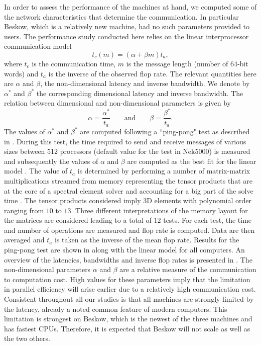 \documentclass{sig-alternate}
\begin{document}
In order to assess the performance of the machines at hand, we computed  some of the network characteristics that determine the communication. In particular Beskow, which is a relatively new machine, had no such parameters provided to users. 
The performance study conducted here relies on the linear interprocessor communication  model
\begin{equation}
 t_c(m) = (\alpha + \beta m) t_a,\label{eqn:lincomm}
\end{equation}
where $t_c$ is the communication time, $m$ is the message length (number of
64-bit words) and $t_a$ is the inverse of the observed flop rate. The relevant
quantities here are $\alpha$ and $\beta$, the non-dimensional latency and inverse
 bandwidth. We denote by $\alpha^*$ and $\beta^*$ the corresponding dimensional 
latency and inverse bandwidth. The relation between dimensional and non-dimensional parameters is given by
\begin{equation*}
\alpha = \frac{\alpha^*}{t_a} \qquad \text{and} \qquad \beta = \frac{\beta^*}{t_a}.
\end{equation*}
The values of $\alpha^*$ and $\beta^*$ are computed following a ``ping-pong" test 
as described in \cite{fischer:scaling}. During this test, the time required to 
send and receive messages of various sizes between 512 processors (default value
for the test in Nek5000) is measured 
and subsequently the values of $\alpha$ and $\beta$ are computed as the best fit 
for the linear model . The value of $t_a$ is determined by 
performing a number of matrix-matrix multiplications streamed from memory
representing the tensor products that are at the core of a spectral element 
solver \cite{fischer:hom} and accounting for a big part of the solve time 
\cite{Max2016}. The tensor products considered imply 3D elements with polynomial 
order ranging from $10$ to $13$. Three different interpretations of the memory 
layout for the matrices are considered 
leading to a total of $12$ tests. For each test, the time and number of operations are
measured and flop rate is computed. Data are then averaged and $t_a$ is taken as the
inverse of the mean flop rate. Results for the ping-pong test are shown in 
 along with the linear model for all computers. An overview 
of the latencies, bandwidths and inverse flop rates is presented in 
. The non-dimensional parameters $\alpha$ and $\beta$ are 
a relative measure of the communication to computation cost. High values for these
parameters imply that the limitation in parallel efficiency will arise earlier due 
to a relatively high communication cost. Consistent throughout all our studies is 
that all machines are strongly limited by the latency, already a noted common 
feature of modern computers. This limitation is strongest on
Beskow, which is the newest of the three machines and has fastest CPUs. Therefore,
it is expected that Beskow will not scale as well as the two others.
\end{document}
